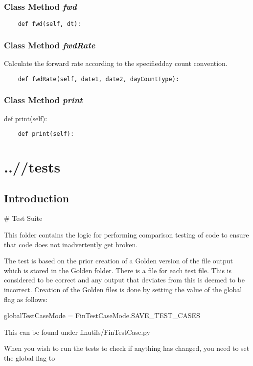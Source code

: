 \documentclass[twoside,11pt]{book}
\begin{document}
\subsection{Class Method {\it fwd}}


\begin{lstlisting}
    def fwd(self, dt):
\end{lstlisting}

\subsection{Class Method {\it fwdRate}}
Calculate the forward rate according to the specifiedday count convention. 

\begin{lstlisting}
    def fwdRate(self, date1, date2, dayCountType):
\end{lstlisting}

\subsection{Class Method {\it print}}
def print(self):

\begin{lstlisting}
    def print(self):
\end{lstlisting}


\chapter{..//tests}
\section{Introduction}
# Test Suite

This folder contains the logic for performing comparison testing of code to ensure that code does not inadvertently get broken.

The test is based on the prior creation of a Golden version of the file output which is stored in the Golden folder. There is a file for each test file. This is considered to be correct and any output that deviates from this is deemed to be incorrect. Creation of the Golden files is done by setting the value of the global flag as follows:

globalTestCaseMode = FinTestCaseMode.SAVE_TEST_CASES

This can be found under finutils/FinTestCase.py

When you wish to run the tests to check if anything has changed, you need to set the global flag to
\end{document}
